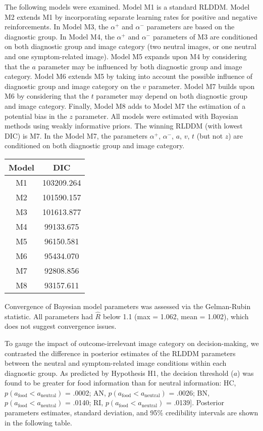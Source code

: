 \documentclass[
  man,floatsintext]{apa6}
\begin{document}
The following models were examined. Model M1 is a standard RLDDM. Model M2 extends M1 by incorporating separate learning rates for positive and negative reinforcements. In Model M3, the \(\alpha^+\) and \(\alpha^-\) parameters are based on the diagnostic group. In Model M4, the \(\alpha^+\) and \(\alpha^-\) parameters of M3 are conditioned on both diagnostic group and image category (two neutral images, or one neutral and one symptom-related image). Model M5 expands upon M4 by considering that the \(a\) parameter may be influenced by both diagnostic group and image category. Model M6 extends M5 by taking into account the possible influence of diagnostic group and image category on the \(v\) parameter. Model M7 builds upon M6 by considering that the \(t\) parameter may depend on both diagnostic group and image category. Finally, Model M8 adds to Model M7 the estimation of a potential bias in the \(z\) parameter. All models were estimated with Bayesian methods using weakly informative priors. The winning RLDDM (with lowest DIC) is M7. In the Model M7, the parameters \(\alpha^+\), \(\alpha^-\), \(a\), \(v\), \(t\) (but not \(z\)) are conditioned on both diagnostic group and image category.

\begin{longtable}[]{@{}cc@{}}
\toprule\noalign{}
Model & DIC \\
\midrule\noalign{}
\endhead
\bottomrule\noalign{}
\endlastfoot
M1 & 103209.264 \\
M2 & 101590.157 \\
M3 & 101613.877 \\
M4 & 99133.675 \\
M5 & 96150.581 \\
M6 & 95434.070 \\
M7 & 92808.856 \\
M8 & 93157.611 \\
\end{longtable}

Convergence of Bayesian model parameters was assessed via the Gelman-Rubin statistic. All parameters had \(\hat{R}\) below 1.1 (max = 1.062, mean = 1.002), which does not suggest convergence issues.

To gauge the impact of outcome-irrelevant image category on decision-making, we contrasted the difference in posterior estimates of the RLDDM parameters between the neutral and symptom-related image conditions within each diagnostic group. As predicted by Hypothesis H1, the decision threshold (\(a\)) was found to be greater for food information than for neutral information: HC, \(p(a_\text{food} < a_\text{neutral})\) = .0002; AN, \(p(a_\text{food} < a_\text{neutral})\) = .0026; BN, \(p(a_\text{food} < a_\text{neutral})\) = .0140; RI, \(p(a_\text{food} < a_\text{neutral})\) = .0139{]}. Posterior parameters estimates, standard deviation, and 95\% credibility intervals are shown in the following table.
\end{document}
